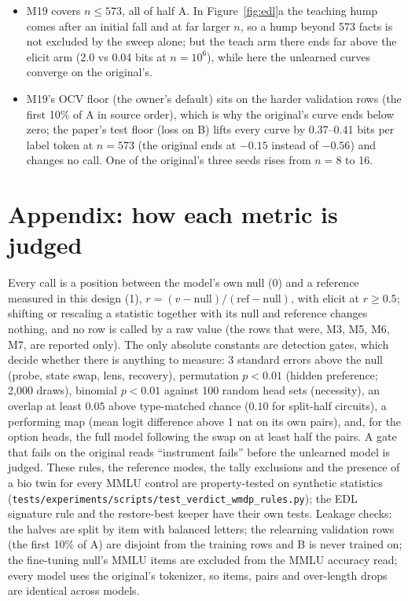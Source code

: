 \documentclass[11pt]{article}
\newenvironment{steps}{\begin{itemize}[nosep,leftmargin=1.2em,topsep=2pt]}{\end{itemize}}
\begin{document}
\begin{steps}
\item M19 covers $n\le573$, all of half A. In Figure~\ref{fig:edl}a the teaching hump comes after an
initial fall and at far larger $n$, so a hump beyond 573 facts is not excluded by the sweep alone;
but the teach arm there ends far above the elicit arm (2.0 vs 0.04 bits at $n=10^6$), while here the
unlearned curves converge on the original's.
\item M19's OCV floor (the owner's default) sits on the harder validation rows (the first 10\% of
A in source order), which is why the original's curve ends below zero; the paper's test floor (loss
on B) lifts every curve by 0.37--0.41 bits per label token at $n=573$ (the original ends at $-0.15$
instead of $-0.56$) and changes no call. One of the original's three seeds rises from $n=8$ to 16.
\end{steps}

\section*{Appendix: how each metric is judged}

Every call is a position between the model's own null (0) and a reference measured in this
design (1), $r=(v-\text{null})/(\text{ref}-\text{null})$, with elicit at $r\ge0.5$; shifting or
rescaling a statistic together with its null and reference changes nothing, and no row is called by
a raw value (the rows that were, M3, M5, M6, M7, are reported only). The only absolute constants are
detection gates, which decide whether there is anything to measure: 3 standard errors above the
null (probe, state swap, lens, recovery), permutation $p<0.01$ (hidden preference; 2{,}000 draws),
binomial $p<0.01$ against 100 random head sets (necessity), an overlap at least $0.05$ above
type-matched chance ($0.10$ for split-half circuits), a performing map (mean logit difference above
1 nat on its own pairs), and, for the option heads, the full model following the swap on at least
half the pairs. A gate that fails on the original reads ``instrument fails'' before the unlearned
model is judged. These rules, the reference modes, the tally exclusions and the presence of a bio
twin for every MMLU control are property-tested on synthetic statistics
(\texttt{tests/experiments/scripts/test\_verdict\_wmdp\_rules.py}); the EDL signature rule and the
restore-best keeper have their own tests. Leakage checks: the halves are split by item with
balanced letters; the relearning validation rows (the first 10\% of A) are disjoint from the
training rows and B is never trained on; the fine-tuning null's MMLU items are excluded from the
MMLU accuracy read; every model uses the original's tokenizer, so items, pairs and over-length
drops are identical across models.
\end{document}
